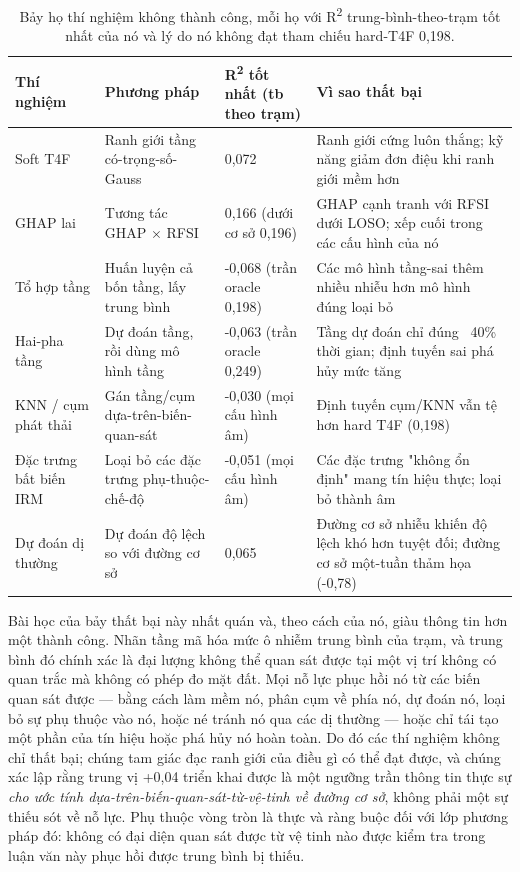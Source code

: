 {\small
\begin{longtable}{llll}
\caption{Bảy họ thí nghiệm không thành công, mỗi họ với R\textsuperscript{2} trung-bình-theo-trạm tốt nhất của nó và lý do nó không đạt tham chiếu hard-T4F 0,198.}\\
\toprule
\textbf{Thí nghiệm} & \textbf{Phương pháp} & \textbf{R\textsuperscript{2} tốt nhất (tb theo trạm)} & \textbf{Vì sao thất bại} \\
\midrule\endhead
Soft T4F & Ranh giới tầng có-trọng-số-Gauss & 0,072 & Ranh giới cứng luôn thắng; kỹ năng giảm đơn điệu khi ranh giới mềm hơn \\
GHAP lai & Tương tác GHAP $\times$ RFSI & 0,166 (dưới cơ sở 0,196) & GHAP cạnh tranh với RFSI dưới LOSO; xếp cuối trong các cấu hình của nó \\
Tổ hợp tầng & Huấn luyện cả bốn tầng, lấy trung bình & -0,068 (trần oracle 0,198) & Các mô hình tầng-sai thêm nhiều nhiễu hơn mô hình đúng loại bỏ \\
Hai-pha tầng & Dự đoán tầng, rồi dùng mô hình tầng & -0,063 (trần oracle 0,249) & Tầng dự đoán chỉ đúng ~40\% thời gian; định tuyến sai phá hủy mức tăng \\
KNN / cụm phát thải & Gán tầng/cụm dựa-trên-biến-quan-sát & -0,030 (mọi cấu hình âm) & Định tuyến cụm/KNN vẫn tệ hơn hard T4F (0,198) \\
Đặc trưng bất biến IRM & Loại bỏ các đặc trưng phụ-thuộc-chế-độ & -0,051 (mọi cấu hình âm) & Các đặc trưng "không ổn định" mang tín hiệu thực; loại bỏ thành âm \\
Dự đoán dị thường & Dự đoán độ lệch so với đường cơ sở & 0,065 & Đường cơ sở nhiễu khiến độ lệch khó hơn tuyệt đối; đường cơ sở một-tuần thảm họa (-0,78) \\
\bottomrule
\end{longtable}
}


Bài học của bảy thất bại này nhất quán và, theo cách của nó, giàu thông tin hơn một thành công. Nhãn tầng mã hóa mức ô nhiễm trung bình của trạm, và trung bình đó chính xác là đại lượng không thể quan sát được tại một vị trí không có quan trắc mà không có phép đo mặt đất. Mọi nỗ lực phục hồi nó từ các biến quan sát được --- bằng cách làm mềm nó, phân cụm về phía nó, dự đoán nó, loại bỏ sự phụ thuộc vào nó, hoặc né tránh nó qua các dị thường --- hoặc chỉ tái tạo một phần của tín hiệu hoặc phá hủy nó hoàn toàn. Do đó các thí nghiệm không chỉ thất bại; chúng tam giác đạc ranh giới của điều gì có thể đạt được, và chúng xác lập rằng trung vị +0,04 triển khai được là một ngưỡng trần thông tin thực sự \emph{cho ước tính dựa-trên-biến-quan-sát-từ-vệ-tinh về đường cơ sở}, không phải một sự thiếu sót về nỗ lực. Phụ thuộc vòng tròn là thực và ràng buộc đối với lớp phương pháp đó: không có đại diện quan sát được từ vệ tinh nào được kiểm tra trong luận văn này phục hồi được trung bình bị thiếu.

